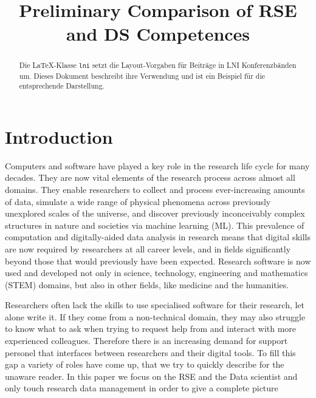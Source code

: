 \documentclass[
        english,biblatex
    ]{lni}
\begin{document}
        \title[]{Preliminary Comparison of RSE and DS Competences}
    
    
    

    \maketitle

        \begin{abstract}
        Die LaTeX-Klasse \texttt{lni} setzt die Layout-Vorgaben für
        Beiträge in LNI Konferenzbänden um. Dieses Dokument beschreibt
        ihre Verwendung und ist ein Beispiel für die entsprechende
        Darstellung.
    \end{abstract}
    
    
    \section{Introduction}\label{introduction}

    Computers and software have played a key role in the research life
    cycle for many decades. They are now vital elements of the research
    process across almost all domains. They enable researchers to
    collect and process ever-increasing amounts of data, simulate a wide
    range of physical phenomena across previously unexplored scales of
    the universe, and discover previously inconceivably complex
    structures in nature and societies via machine learning (ML). This
    prevalence of computation and digitally-aided data analysis in
    research means that digital skills are now required by researchers
    at all career levels, and in fields significantly beyond those that
    would previously have been expected. Research software is now used
    and developed not only in science, technology, engineering and
    mathematics (STEM) domains, but also in other fields, like medicine
    and the humanities.

    Researchers often lack the skills to use specialised software for
    their research, let alone write it. If they come from a
    non-technical domain, they may also struggle to know what to ask
    when trying to request help from and interact with more experienced
    colleagues. Therefore there is an increasing demand for support
    personel that interfaces between researchers and their digital
    tools. To fill this gap a variety of roles have come up, that we try
    to quickly describe for the unaware reader. In this paper we focus
    on the RSE and the Data scientist and only touch research data
    management in order to give a complete picture
\end{document}
